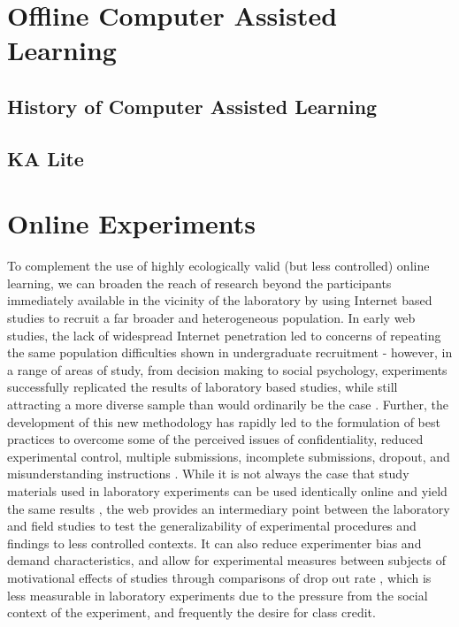 \documentclass[12pt,a4paper,titlepage]{scrreprt}
\begin{document}
\section{Offline Computer Assisted Learning}

\subsection{History of Computer Assisted Learning}

\subsection{KA Lite}

\section{Online Experiments}
To complement the use of highly ecologically valid (but less controlled) online learning, we can broaden the reach of research beyond the participants immediately available in the vicinity of the laboratory by using Internet based studies to recruit a far broader and heterogeneous population. In early web studies, the lack of widespread Internet penetration led to concerns of repeating the same population difficulties shown in undergraduate recruitment - however, in a range of areas of study, from decision making to social psychology, experiments successfully replicated the results of laboratory based studies, while still attracting a more diverse sample than would ordinarily be the case \parencite{krantz_comparing_1997,buchanan_using_1999,birnbaum_decision_2000,mcgraw_integrity_2000,gosling_should_2004,ritter_internet_2004}. Further, the development of this new methodology has rapidly led to the formulation of best practices to overcome some of the perceived issues of confidentiality, reduced experimental control, multiple submissions, incomplete submissions, dropout, and misunderstanding instructions \parencite{reips_web_2000,reips_standards_2002,birnbaum_human_2004}. While it is not always the case that study materials used in laboratory experiments can be used identically online and yield the same results \parencite{buchanan_nonequivalence_2005}, the web provides an intermediary point between the laboratory and field studies to test the generalizability of experimental procedures and findings to less controlled contexts. It can also reduce experimenter bias and demand characteristics, and allow for experimental measures between subjects of motivational effects of studies through comparisons of drop out rate \parencite{reips_web_2000}, which is less measurable in laboratory experiments due to the pressure from the social context of the experiment, and frequently the desire for class credit.
\end{document}
